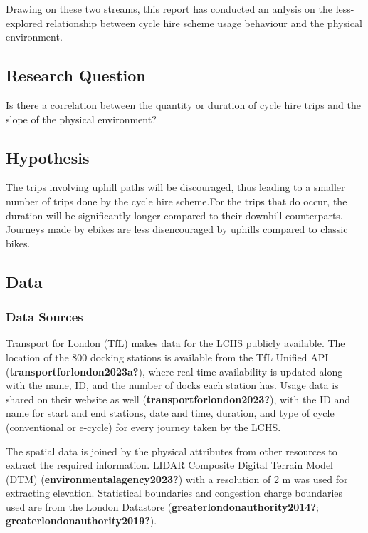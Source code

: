 \documentclass[
  letterpaper,
  DIV=11,
  numbers=noendperiod]{scrartcl}
\begin{document}
Drawing on these two streams, this report has conducted an anlysis on
the less-explored relationship between cycle hire scheme usage behaviour
and the physical environment.

\hypertarget{research-question}{%
\subsection{Research Question}\label{research-question}}

Is there a correlation between the quantity or duration of cycle hire
trips and the slope of the physical environment?

\hypertarget{hypothesis}{%
\subsection{Hypothesis}\label{hypothesis}}

The trips involving uphill paths will be discouraged, thus leading to a
smaller number of trips done by the cycle hire scheme.For the trips that
do occur, the duration will be significantly longer compared to their
downhill counterparts. Journeys made by ebikes are less disencouraged by
uphills compared to classic bikes.

\hypertarget{data}{%
\subsection{Data}\label{data}}

\hypertarget{data-sources}{%
\subsubsection{Data Sources}\label{data-sources}}

Transport for London (TfL) makes data for the LCHS publicly available.
The location of the 800 docking stations is available from the TfL
Unified API (\textbf{transportforlondon2023a?}), where real time
availability is updated along with the name, ID, and the number of docks
each station has. Usage data is shared on their website as well
(\textbf{transportforlondon2023?}), with the ID and name for start and
end stations, date and time, duration, and type of cycle (conventional
or e-cycle) for every journey taken by the LCHS.

The spatial data is joined by the physical attributes from other
resources to extract the required information. LIDAR Composite Digital
Terrain Model (DTM) (\textbf{environmentalagency2023?}) with a
resolution of 2 m was used for extracting elevation. Statistical
boundaries and congestion charge boundaries used are from the London
Datastore (\textbf{greaterlondonauthority2014?};
\textbf{greaterlondonauthority2019?}).
\end{document}
